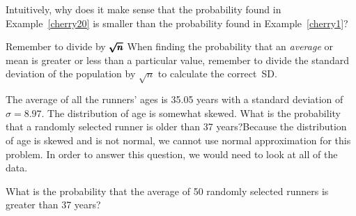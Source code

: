\begin{exercisewrap}
\begin{nexercise}
Intuitively, why does it make sense that the probability found in Example~\ref{cherry20} is smaller than the probability found in Example~\ref{cherry1}?\footnotemark
\end{nexercise}
\end{exercisewrap}


\begin{onebox}{Remember to divide by $\pmb{\sqrt{\MakeLowercase{n}}}$}
When finding the probability that an \emph{average} or mean is greater or less than a particular value, remember to divide the standard deviation of the population by $\sqrt{n}$ to calculate the correct~SD.\end{onebox}

\D{\newpage}

\begin{examplewrap}
\begin{nexample}{
The average of all the runners' ages is 35.05 years with a standard deviation of $\sigma = 8.97$. The distribution of age is somewhat skewed. What is the probability that a randomly selected runner is older than 37 years?}Because the distribution of age is skewed and is not normal, we cannot use normal approximation for this problem. In order to answer this question, we would need to look at all of the data.
\end{nexample}
\end{examplewrap}

\begin{exercisewrap}
\begin{nexercise}
What is the probability that the average of 50 randomly selected runners is greater than 37 years?\footnotemark
\end{nexercise}
\end{exercisewrap}

